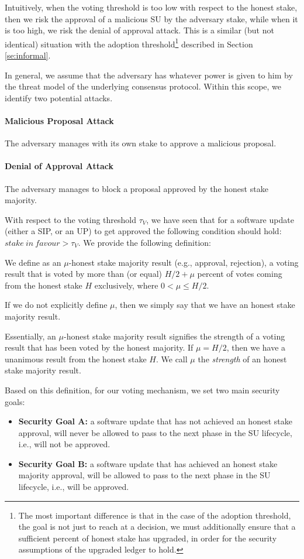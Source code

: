 Intuitively, when the voting threshold is too low with respect to the honest stake, then we risk the approval of a malicious SU by the adversary stake, while when it is too high, we risk the denial of approval attack. This is a similar (but not identical) situation with the adoption threshold\footnote{The most important difference is that in the case of the adoption threshold, the goal is not just to reach at a decision, we must additionally ensure that a sufficient percent of honest stake has upgraded, in order for the security assumptions of the upgraded ledger to hold.} described in Section \ref{se:informal}.

In general, we assume that the adversary has whatever power is given to him by the threat model of the underlying consensus protocol. Within this scope, we identify two potential attacks.

\paragraph{Malicious Proposal Attack}
The adversary manages with its own stake to approve a malicious proposal.

\paragraph{Denial of Approval Attack}
The adversary manages to block a proposal approved by the honest stake majority.

With respect to the voting threshold $\tau_V$, we have seen that for a software update (either a SIP, or an UP) to get approved the following condition should hold: $stake\ in\ favour > \tau_V$. We provide the following definition:
\begin{definition}
We define as an $\mu$-honest stake majority result (e.g., approval, rejection), a voting result that is voted by more than (or equal) $H/2 + \mu$ percent of votes coming from the honest stake $H$ exclusively, where $0 < \mu \leq H/2$.

If we do not explicitly define $\mu$, then we simply say that we have an honest stake majority result.
\end{definition}
Essentially, an $\mu$-honest stake majority result signifies the strength of a voting result that has been voted by the honest majority. If $\mu = H/2$, then we have a unanimous result from the honest stake $H$. We call $\mu$ the \emph{strength} of an honest stake majority result.

Based on this definition, for our voting mechanism, we set two main security goals:
\begin{itemize}
\item \textbf{Security Goal A:} a software update that has not achieved an honest stake approval, will never be allowed to pass to the next phase in the SU lifecycle, i.e., will not be approved.
\item \textbf{Security Goal B:} a software update that has achieved an honest stake majority approval, will be allowed to pass to the next phase in the SU lifecycle, i.e., will be approved.
\end{itemize}

